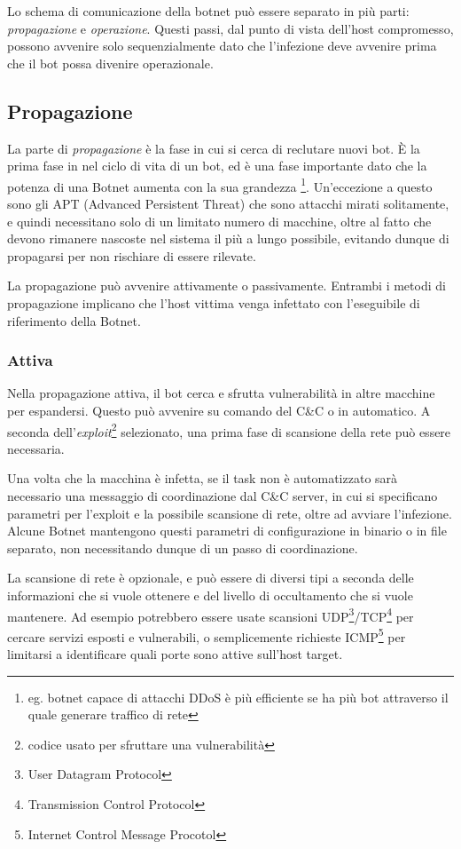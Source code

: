 Lo schema di comunicazione della botnet può essere separato in più parti: \emph{propagazione} e \emph{operazione}. Questi passi, dal punto di vista dell'host compromesso, possono avvenire solo sequenzialmente dato che l'infezione deve avvenire prima che il bot possa divenire operazionale. 
\subsection{Propagazione}
La parte di \emph{propagazione} è la fase in cui si cerca di reclutare nuovi bot. È la prima fase in nel ciclo di vita di un bot, ed è una fase importante dato che la potenza di una Botnet aumenta con la sua grandezza \footnote{eg. botnet capace di attacchi DDoS è più efficiente se ha più bot attraverso il quale generare traffico di rete}. Un'eccezione a questo sono gli APT (Advanced Persistent Threat) che sono attacchi mirati solitamente, e quindi necessitano solo di un limitato numero di macchine, oltre al fatto che devono rimanere nascoste nel sistema il più a lungo possibile, evitando dunque di propagarsi per non rischiare di essere rilevate.

La propagazione può avvenire attivamente o passivamente.
Entrambi i metodi di propagazione implicano che l'host vittima venga infettato con l'eseguibile di riferimento della  Botnet. 
\subsubsection{Attiva}
\label{PropagazioneAttiva}
Nella propagazione attiva, il bot cerca e sfrutta vulnerabilità in altre macchine per espandersi. Questo può avvenire su comando del C\&C o in automatico. A seconda dell'\textit{exploit}\footnote{codice usato per sfruttare una vulnerabilità} selezionato, una prima fase di scansione della rete può essere necessaria.


Una volta che la macchina è infetta, se il task non è automatizzato sarà necessario una messaggio di coordinazione dal C\&C server, in cui si specificano parametri per l'exploit e la possibile scansione di rete, oltre ad avviare l'infezione. Alcune Botnet mantengono questi parametri di configurazione in binario o in file separato, non necessitando dunque di un passo di coordinazione. 

La scansione di rete è opzionale, e può essere di diversi tipi a seconda delle informazioni che si vuole ottenere e del livello di occultamento che si vuole mantenere. Ad esempio potrebbero essere usate scansioni UDP\footnote{User Datagram Protocol}/TCP\footnote{Transmission Control Protocol} per cercare servizi esposti e vulnerabili, o semplicemente richieste ICMP\footnote{Internet Control Message Procotol} per limitarsi a identificare quali porte sono attive sull'host target.


